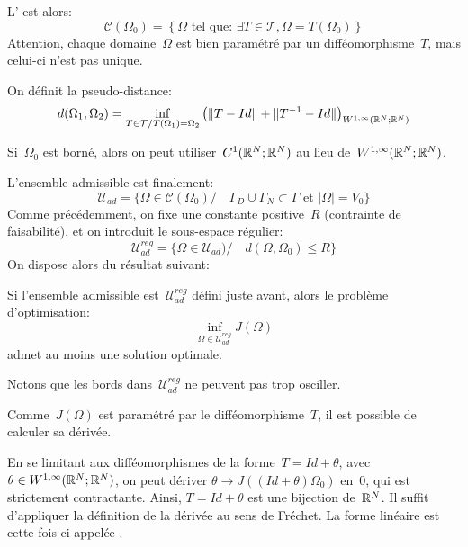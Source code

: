 L' est alors:
\begin{equation}
\mathcal{C}(\Omega_0)=\left\{ \Omega \text{ tel que: } \exists T\in\mathcal{T}, \Omega=T(\Omega_0) \right\}
\end{equation}
Attention, chaque domaine~$\Omega$ est bien paramétré par un difféomorphisme~$T$, mais celui-ci n'est pas unique.

On définit la pseudo-distance:
\begin{equation}
d(\Omega_1,\Omega_2) = \inf_{T\in\mathcal{T}/ T(\Omega_1)=\Omega_2}
\left( \|T-Id\|+\|T^{-1}-Id\|\right)_{W^{1,\infty}(\mathbb R^N;\mathbb R^N)}
\end{equation}

Si~$\Omega_0$ est borné, alors on peut utiliser~$C^1(\mathbb R^N;\mathbb R^N)$ au lieu de~$W^{1,\infty}(\mathbb R^N;\mathbb R^N)$.

\medskip
L'ensemble admissible est finalement:
\begin{equation}
\mathcal{U}_{ad} = \{ \Omega\in\mathcal{C}(\Omega_0) / \quad
\Gamma_D \cup \Gamma_N \subset \Gamma \text{ et } |\Omega|=V_0 \}
\end{equation}
Comme précédemment, on fixe une constante positive~$R$ (contrainte de faisabilité), et on introduit le sous-espace régulier:
\begin{equation}
\mathcal{U}_{ad}^{reg} = \{ \Omega\in\mathcal{U}_{ad}) / \quad
d(\Omega,\Omega_0)\le R \}
\end{equation}
On dispose alors du résultat suivant:
\begin{theoreme}
Si l'ensemble admissible est~$\mathcal{U}_{ad}^{reg}$ défini juste avant, alors le problème d'optimisation:
\[ \inf_{\Omega\in\mathcal{U}_{ad}^{reg}} J(\Omega) \]
admet au moins une solution optimale.
\end{theoreme}

Notons que les bords dans~$\mathcal{U}_{ad}^{reg}$ ne peuvent pas trop osciller.

\medskip
Comme~$J(\Omega)$ est paramétré par le difféomorphisme~$T$, il est possible de calculer sa dérivée.

En se limitant aux difféomorphismes de la forme~$T=Id+\theta$, avec~$\theta\in W^{1,\infty}(\mathbb R^N;\mathbb R^N)$, on peut dériver $\theta \rightarrow J((Id+\theta)\Omega_0)$ en~$0$, qui est strictement contractante. Ainsi, $T=Id+\theta$ est une bijection de~$\mathbb R^N$. Il suffit d'appliquer la définition de la dérivée au sens de Fréchet. La forme linéaire est cette fois-ci appelée .

